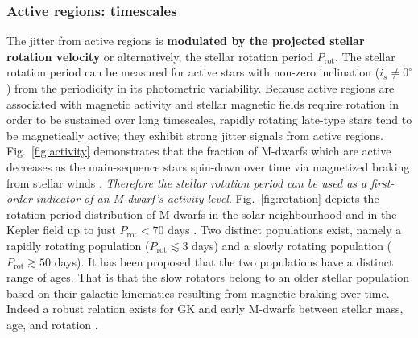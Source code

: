 \subsubsection{Active regions: timescales}
The jitter from active regions is 
\textbf{modulated by the projected stellar rotation velocity} \vsini{} or alternatively, the stellar rotation 
period $P_{\mathrm{rot}}$. The stellar rotation period can be measured for active stars with non-zero 
inclination ($i_s \ne 0^{\circ}$) from the periodicity in its photometric variability. 
Because active regions are associated with magnetic activity and stellar 
magnetic fields require rotation in order to be sustained over long timescales, rapidly rotating 
late-type stars tend to be magnetically active; they exhibit strong jitter signals from active regions. 
Fig.~\ref{fig:activity} demonstrates that the fraction of M-dwarfs which are active \parencite{west15} 
decreases as the main-sequence stars spin-down over time via magnetized braking from stellar winds 
\parencite{skumanich72}. \emph{Therefore the stellar rotation period can be used as a first-order 
indicator of an M-dwarf's activity level}. Fig.~\ref{fig:rotation} depicts the rotation period 
distribution of M-dwarfs in the solar neighbourhood \parencite{newton16a} and in the Kepler 
field up to just $P_{\mathrm{rot}} < 70$ days \parencite{mcquillan13a}. 
Two distinct populations exist, namely a rapidly 
rotating population ($P_{\mathrm{rot}} \lesssim 3$ days) and a slowly rotating population 
($P_{\mathrm{rot}} \gtrsim 50$ days). It has been proposed that the two populations 
have a distinct range of ages. That is that 
the slow rotators belong to an older stellar population based on their galactic 
kinematics \parencite{irwin11} resulting from magnetic-braking over time. 
Indeed a robust relation exists for GK and early M-dwarfs between stellar 
mass, age, and rotation \parencite[gyrochronology;][]{barnes03}. \\

